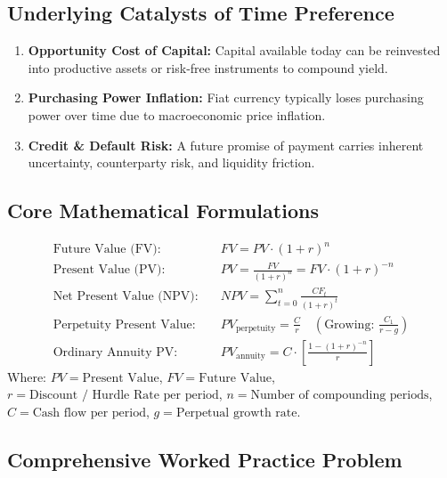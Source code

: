 \documentclass[11pt,a4paper]{article}
\begin{document}
\subsection{Underlying Catalysts of Time Preference}
\begin{enumerate}
  \item \textbf{Opportunity Cost of Capital:} Capital available today can be reinvested into productive assets or risk-free instruments to compound yield.
  \item \textbf{Purchasing Power Inflation:} Fiat currency typically loses purchasing power over time due to macroeconomic price inflation.
  \item \textbf{Credit \& Default Risk:} A future promise of payment carries inherent uncertainty, counterparty risk, and liquidity friction.
\end{enumerate}

\subsection{Core Mathematical Formulations}

\begin{formulabox}
\begin{align}
\text{Future Value (FV):} \quad & FV = PV \cdot (1 + r)^n \\[6pt]
\text{Present Value (PV):} \quad & PV = \frac{FV}{(1 + r)^n} = FV \cdot (1 + r)^{-n} \\[6pt]
\text{Net Present Value (NPV):} \quad & NPV = \sum_{t=0}^{n} \frac{CF_t}{(1 + r)^t} \\[6pt]
\text{Perpetuity Present Value:} \quad & PV_{\text{perpetuity}} = \frac{C}{r} \quad (\text{Growing: } \frac{C_1}{r - g}) \\[6pt]
\text{Ordinary Annuity PV:} \quad & PV_{\text{annuity}} = C \cdot \left[ \frac{1 - (1 + r)^{-n}}{r} \right]
\end{align}
Where: $PV = \text{Present Value}$, $FV = \text{Future Value}$, $r = \text{Discount / Hurdle Rate per period}$, $n = \text{Number of compounding periods}$, $C = \text{Cash flow per period}$, $g = \text{Perpetual growth rate}$.
\end{formulabox}

\subsection{Comprehensive Worked Practice Problem}
\end{document}
